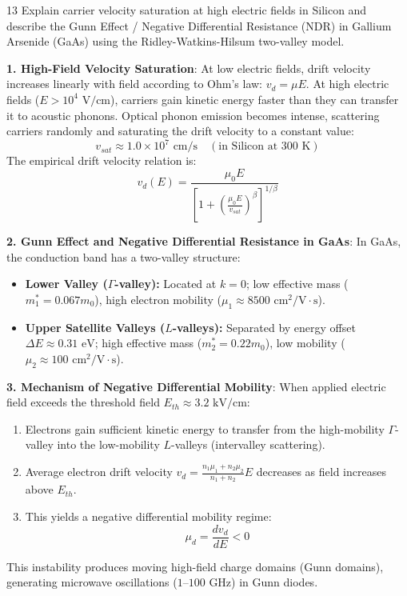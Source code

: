 \begin{theoryq}{13}
Explain carrier velocity saturation at high electric fields in Silicon and describe the Gunn Effect / Negative Differential Resistance (NDR) in Gallium Arsenide (GaAs) using the Ridley-Watkins-Hilsum two-valley model.
\end{theoryq}
\begin{theorysol}
\textbf{1. High-Field Velocity Saturation}:
At low electric fields, drift velocity increases linearly with field according to Ohm's law: $v_d = \mu E$.
At high electric fields ($E > 10^4\text{ V/cm}$), carriers gain kinetic energy faster than they can transfer it to acoustic phonons. Optical phonon emission becomes intense, scattering carriers randomly and saturating the drift velocity to a constant value:
\begin{equation}
v_{sat} \approx 1.0 \times 10^7\text{ cm/s}\quad (\text{in Silicon at }300\text{ K})
\end{equation}
The empirical drift velocity relation is:
\begin{equation}
v_d(E) = \frac{\mu_0 E}{\left[1 + \left(\frac{\mu_0 E}{v_{sat}}\right)^\beta\right]^{1/\beta}}
\end{equation}

\textbf{2. Gunn Effect and Negative Differential Resistance in GaAs}:
In GaAs, the conduction band has a two-valley structure:
\begin{itemize}
\item \textbf{Lower Valley ($\Gamma$-valley):} Located at $k=0$; low effective mass ($m_1^* = 0.067 m_0$), high electron mobility ($\mu_1 \approx 8500\text{ cm}^2/\text{V}\cdot\text{s}$).
\item \textbf{Upper Satellite Valleys ($L$-valleys):} Separated by energy offset $\Delta E \approx 0.31\text{ eV}$; high effective mass ($m_2^* = 0.22 m_0$), low mobility ($\mu_2 \approx 100\text{ cm}^2/\text{V}\cdot\text{s}$).
\end{itemize}

\textbf{3. Mechanism of Negative Differential Mobility}:
When applied electric field exceeds the threshold field $E_{th} \approx 3.2\text{ kV/cm}$:
\begin{enumerate}
\item Electrons gain sufficient kinetic energy to transfer from the high-mobility $\Gamma$-valley into the low-mobility $L$-valleys (intervalley scattering).
\item Average electron drift velocity $v_d = \frac{n_1 \mu_1 + n_2 \mu_2}{n_1 + n_2} E$ decreases as field increases above $E_{th}$.
\item This yields a negative differential mobility regime:
\begin{equation}
\mu_d = \frac{dv_d}{dE} < 0
\end{equation}
\end{enumerate}
This instability produces moving high-field charge domains (Gunn domains), generating microwave oscillations ($1\text{--}100\text{ GHz}$) in Gunn diodes.
\end{theorysol}
\vspace{4mm}


